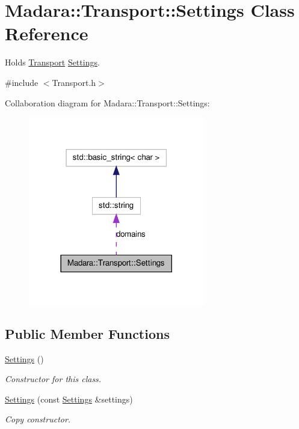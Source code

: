 \hypertarget{classMadara_1_1Transport_1_1Settings}{
\section{Madara::Transport::Settings Class Reference}
\label{d1/d14/classMadara_1_1Transport_1_1Settings}
}


Holds \hyperlink{namespaceMadara_1_1Transport}{Transport} \hyperlink{classMadara_1_1Transport_1_1Settings}{Settings}.  




{\ttfamily \#include $<$Transport.h$>$}



Collaboration diagram for Madara::Transport::Settings:
\nopagebreak
\begin{figure}[H]
\begin{center}
\leavevmode
\includegraphics[width=218pt]{dc/daf/classMadara_1_1Transport_1_1Settings__coll__graph}
\end{center}
\end{figure}
\subsection*{Public Member Functions}
\begin{DoxyCompactItemize}
\item 
\hyperlink{classMadara_1_1Transport_1_1Settings_a6a8ba212b70bd8b8ae7b9a9ecff478f4}{Settings} ()
\begin{DoxyCompactList}\small\item\em Constructor for this class. \item\end{DoxyCompactList}\item 
\hyperlink{classMadara_1_1Transport_1_1Settings_a644f3e7cd166a47fa0a2da5129509e8a}{Settings} (const \hyperlink{classMadara_1_1Transport_1_1Settings}{Settings} \&settings)
\begin{DoxyCompactList}\small\item\em Copy constructor. \item\end{DoxyCompactList}\end{DoxyCompactItemize}
